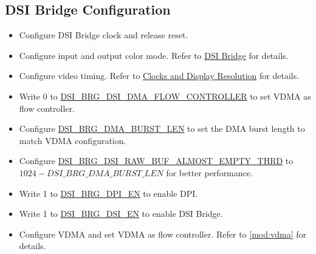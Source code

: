 \documentclass[main\_\_EN.tex]{subfiles}
\begin{document}
\subsection{DSI Bridge Configuration}
\label{sec:dsi-bridge-configuration}
\begin{itemize}
    \item Configure DSI Bridge clock and release reset.
    \item Configure input and output color mode. Refer to \hyperref[sec:dsi-bridge]{DSI Bridge} for details.
    \item Configure video timing. Refer to \hyperref[sec:clocks-and-display-resolution]{Clocks and Display Resolution} for details.
    \item Write 0 to \hyperref[fielddesc:DSIBRGDSIDMAFLOWCONTROLLER]{DSI\_BRG\_DSI\_DMA\_FLOW\_CONTROLLER} to set VDMA as flow controller.
    \item Configure \hyperref[fielddesc:DSIBRGDMABURSTLEN]{DSI\_BRG\_DMA\_BURST\_LEN} to set the DMA burst length to match VDMA configuration.
    \item Configure \hyperref[fielddesc:DSIBRGDSIRAWBUFALMOSTEMPTYTHRD]{DSI\_BRG\_DSI\_RAW\_BUF\_ALMOST\_EMPTY\_THRD} to $1024 - \hyperref[fielddesc:DSIBRGDMABURSTLEN]{DSI\_BRG\_DMA\_BURST\_LEN}$ for better performance.
    \item Write 1 to \hyperref[fielddesc:DSIBRGDPIEN]{DSI\_BRG\_DPI\_EN} to enable DPI.
    \item Write 1 to \hyperref[fielddesc:DSIBRGDSIEN]{DSI\_BRG\_DSI\_EN} to enable DSI Bridge.
    \item Configure VDMA and set VDMA as flow controller. Refer to \ref{mod:vdma} for details.
\end{itemize}
\label{sec:mipidsi-dsi-bridge-programming-proc}
\end{document}
